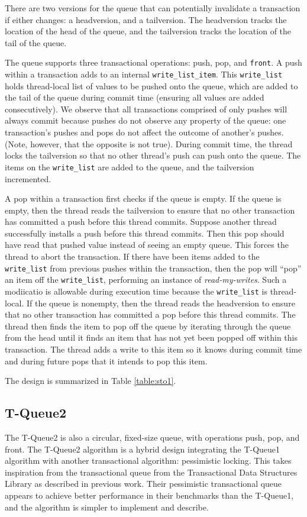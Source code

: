 There are two versions for the queue that can potentially invalidate a transaction if either changes: a headversion, and a tailversion. The headversion tracks the location of the head of the queue, and the tailversion tracks the location of the tail of the queue.

The queue supports three transactional operations: push, pop, and \texttt{front}. A push within a transaction adds to an internal \texttt{write\_list\_item}. This \texttt{write\_list} holds thread-local list of values to be pushed onto the queue, which are added to the tail of the queue during commit time (ensuring all values are added consecutively). We observe that all transactions comprised of only pushes will always commit because pushes do not observe any property of the queue: one transaction's pushes and pops do not affect the outcome of another's pushes. (Note, however, that the opposite is not true). During commit time, the thread locks the tailversion so that no other thread's push can push onto the queue. The items on the \texttt{write\_list} are added to the queue, and the tailversion incremented.

A pop within a transaction first checks if the queue is empty. If the queue is empty, then the thread reads the tailversion to ensure that no other transaction has committed a push before this thread commits. Suppose another thread successfully installs a push before this thread commits. Then this pop should have read that pushed value instead of seeing an empty queue. This forces the thread to abort the transaction. If there have been items added to the \texttt{write\_list} from previous pushes within the transaction, then the pop will “pop” an item off the \texttt{write\_list}, performing an instance of \emph{read-my-writes}. Such a modiicatio is allowable during execution time because the \texttt{write\_list} is thread-local. If the queue is nonempty, then the thread reads the headversion to ensure that no other transaction has committed a pop before this thread commits. The thread then finds the item to pop off the queue by iterating through the queue from the head until it finds an item that has not yet been popped off within this transaction. The thread adds a write to this item so it knows during commit time and during future pops that it intends to pop this item.

The design is summarized in Table \ref{table:sto1}.

\subsection{T-Queue2}
The T-Queue2 is also a circular, fixed-size queue, with operations push, pop, and front. The T-Queue2 algorithm is a hybrid design integrating the T-Queue1 algorithm with another transactional algorithm: pessimistic locking. This takes inspiration from the transactional queue from the Transactional Data Structures Library\cite{tdsl} as described in previous work. Their pessimistic transactional queue appears to achieve better performance in their benchmarks than the T-Queue1, and the algorithm is simpler to implement and describe. 

